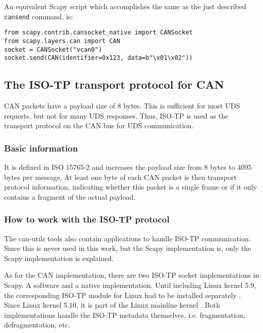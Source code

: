 An equivalent Scapy script which accomplishes the same as the just described \texttt{cansend} command, is:

\begin{samepage}
\begin{verbatim}
from scapy.contrib.cansocket_native import CANSocket
from scapy.layers.can import CAN
socket = CANSocket("vcan0")
socket.send(CAN(identifier=0x123, data=b"\x01\x02"))
\end{verbatim}
\end{samepage}

\subsection{The ISO-TP transport protocol for CAN}

CAN packets have a payload size of 8 bytes. This is sufficient for most UDS requests, but not for many UDS responses. Thus, ISO-TP is used as the transport protocol on the CAN bus for UDS communication.

\subsubsection{Basic information}

It is defined in ISO 15765-2 and increases the payload size from 8 bytes to 4095 bytes per message. At least one byte of each CAN packet is then transport protocol information, indicating whether this packet is a single frame or if it only contains a fragment of the actual payload.

\subsubsection{How to work with the ISO-TP protocol}

The can-utils tools also contain applications to handle ISO-TP communication. Since this is never used in this work, but the Scapy implementation is, only the Scapy implementation is explained.

As for the CAN implementation, there are two ISO-TP socket implementations in Scapy. A software and a native implementation. Until including Linux kernel 5.9, the corresponding ISO-TP module for Linux had to be installed separately \cite{isotp-module}. Since Linux kernel 5.10, it is part of the Linux mainline kernel \cite{isotp-commit}. Both implementations handle the ISO-TP metadata themselves, i.e.  fragmentation, defragmentation, etc.


